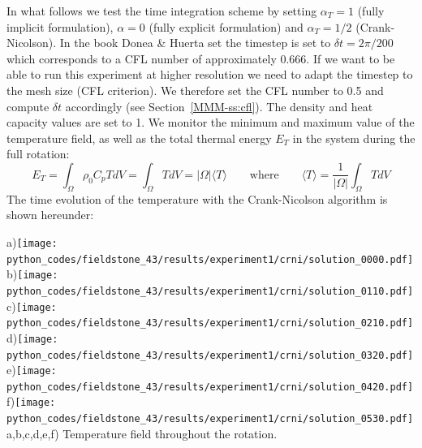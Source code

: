 In what follows we test the time integration scheme by setting $\alpha_T=1$ 
(fully implicit formulation), $\alpha=0$ (fully explicit formulation) and $\alpha_T=1/2$ (Crank-Nicolson).  
In the book Donea \& Huerta set the timestep is set to $\delta t=2\pi/200$ which corresponds 
to a CFL number of approximately 0.666. If we want to be able to run this experiment at higher 
resolution we need to adapt the timestep to the mesh size (CFL criterion). We 
therefore set the CFL number to 0.5 and compute $\delta t$ 
accordingly (see Section~\ref{MMM-ss:cfl}).  
The density and heat capacity values are set to 1. We monitor the minimum 
and maximum value of the temperature field, as well as the total thermal energy $E_T$ in the 
system during the full rotation:
\[
E_T=\int_\Omega \rho_0 C_p T dV = \int_\Omega T dV = |\Omega| \langle T \rangle 
\qquad
\text{where}
\qquad
\langle T \rangle = \frac{1}{|\Omega|} \int_\Omega T dV
\]
The time evolution of the temperature with the Crank-Nicolson algorithm is shown hereunder:
\begin{center}
a)\texttt{[image: python\_codes/fieldstone\_43/results/experiment1/crni/solution\_0000.pdf]}
b)\texttt{[image: python\_codes/fieldstone\_43/results/experiment1/crni/solution\_0110.pdf]}
c)\texttt{[image: python\_codes/fieldstone\_43/results/experiment1/crni/solution\_0210.pdf]}
d)\texttt{[image: python\_codes/fieldstone\_43/results/experiment1/crni/solution\_0320.pdf]}
e)\texttt{[image: python\_codes/fieldstone\_43/results/experiment1/crni/solution\_0420.pdf]}
f)\texttt{[image: python\_codes/fieldstone\_43/results/experiment1/crni/solution\_0530.pdf]}\\
{\captionfont a,b,c,d,e,f) Temperature field throughout the rotation.} 
\end{center}

\vspace{.4cm}

